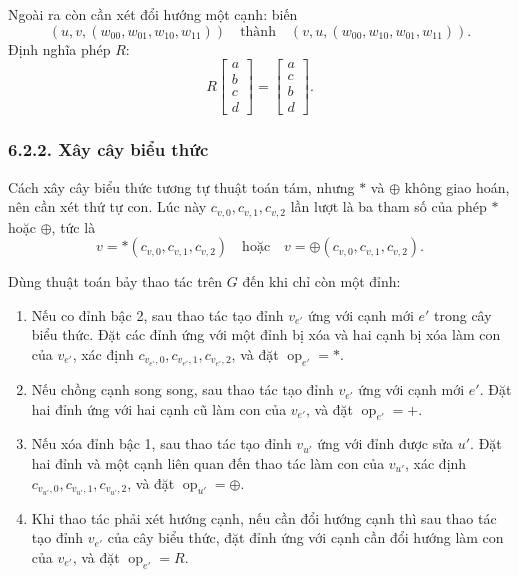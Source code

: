 \documentclass[11pt]{article}
\begin{document}
Ngoài ra còn cần xét đổi hướng một cạnh: biến
\[
  (u,v,(w_{00},w_{01},w_{10},w_{11}))
  \quad\text{thành}\quad
  (v,u,(w_{00},w_{10},w_{01},w_{11})).
\]
Định nghĩa phép \(R\):
\[
  R\begin{bmatrix}a\\b\\c\\d\end{bmatrix}
  =
  \begin{bmatrix}a\\c\\b\\d\end{bmatrix}.
\]

\subsubsection*{6.2.2. Xây cây biểu thức}

Cách xây cây biểu thức tương tự thuật toán tám, nhưng \(\ast\) và \(\oplus\)
không giao hoán, nên cần xét thứ tự con. Lúc này \(c_{v,0},c_{v,1},c_{v,2}\)
lần lượt là ba tham số của phép \(\ast\) hoặc \(\oplus\), tức là
\[
  v=\ast(c_{v,0},c_{v,1},c_{v,2})
  \quad\text{hoặc}\quad
  v=\oplus(c_{v,0},c_{v,1},c_{v,2}).
\]

Dùng thuật toán bảy thao tác trên \(G\) đến khi chỉ còn một đỉnh:
\begin{enumerate}
  \item Nếu co đỉnh bậc 2, sau thao tác tạo đỉnh \(v_{e'}\) ứng với cạnh mới
        \(e'\) trong cây biểu thức. Đặt các đỉnh ứng với một đỉnh bị xóa và
        hai cạnh bị xóa làm con của \(v_{e'}\), xác định
        \(c_{v_{e'},0},c_{v_{e'},1},c_{v_{e'},2}\), và đặt
        \(\operatorname{op}_{e'}=\ast\).
  \item Nếu chồng cạnh song song, sau thao tác tạo đỉnh \(v_{e'}\) ứng với
        cạnh mới \(e'\). Đặt hai đỉnh ứng với hai cạnh cũ làm con của
        \(v_{e'}\), và đặt \(\operatorname{op}_{e'}=+\).
  \item Nếu xóa đỉnh bậc 1, sau thao tác tạo đỉnh \(v_{u'}\) ứng với đỉnh được
        sửa \(u'\). Đặt hai đỉnh và một cạnh liên quan đến thao tác làm con
        của \(v_{u'}\), xác định \(c_{v_{u'},0},c_{v_{u'},1},c_{v_{u'},2}\),
        và đặt \(\operatorname{op}_{u'}=\oplus\).
  \item Khi thao tác phải xét hướng cạnh, nếu cần đổi hướng cạnh thì sau thao
        tác tạo đỉnh \(v_{e'}\) của cây biểu thức, đặt đỉnh ứng với cạnh cần
        đổi hướng làm con của \(v_{e'}\), và đặt \(\operatorname{op}_{e'}=R\).
\end{enumerate}
\end{document}
